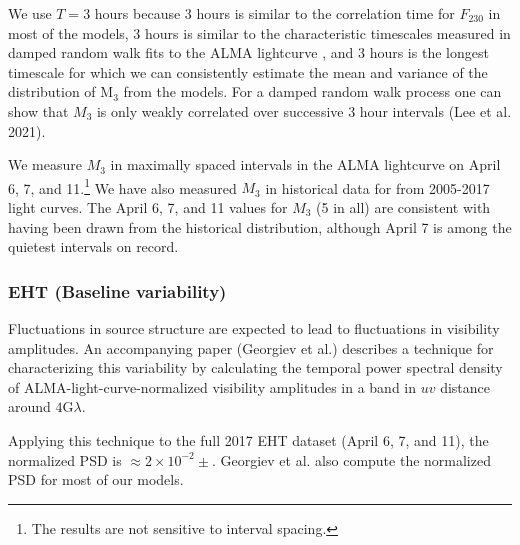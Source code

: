 We use $T = 3$ hours because 3 hours is similar to the correlation time for $F_{230}$ in most of the models, 3 hours is similar to the characteristic timescales measured in damped random walk fits to the ALMA lightcurve \citep[see Table 10 of][]{Wielgus2022}, and 3 hours is the longest timescale for which we can consistently estimate the mean and variance of the distribution of M$_3$ from the models.  For a damped random walk process one can show that $M_3$ is only weakly correlated over successive 3 hour intervals (Lee et al. 2021).

We measure $M_3$ in maximally spaced intervals in the ALMA lightcurve on April 6, 7, and 11.\footnote{The results are not sensitive to interval spacing.}  We have also measured $M_3$ in historical data for \sgra from 2005-2017 light curves.  The April 6, 7, and 11 values for $M_3$ (5 in all) are consistent with having been drawn from the historical distribution, although April 7 is among the quietest intervals on record.  


\subsubsection{EHT (Baseline variability)}


Fluctuations in source structure are expected to lead to fluctuations in visibility amplitudes.  An accompanying paper  (Georgiev et al.) describes a technique for characterizing this variability by calculating the temporal power spectral density of ALMA-light-curve-normalized visibility amplitudes in a band in $uv$ distance around $4$G$\lambda$.

Applying this technique to the full 2017 EHT dataset (April 6, 7, and 11), the normalized PSD is $\approx 2 \times 10^{-2} \pm $.
Georgiev et al. also compute the normalized PSD for most of our models.  
